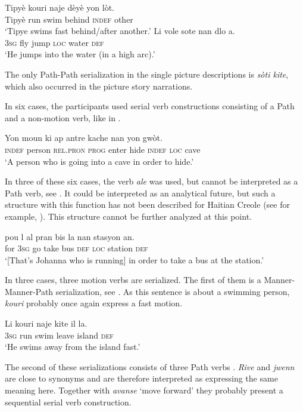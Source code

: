 \documentclass[output=paper,colorlinks,citecolor=brown]{langscibook}
\begin{document}
\ea\label{ex:3:60}
\gll Tipyè kouri naje dèyè yon lòt.\\
     Tipyè run swim behind \textsc{indef} other \\
\glt ‘Tipye swims fast behind/after another.’
\ex\label{ex:3:61}
\gll Li vole sote nan dlo a.\\
     \textsc{3sg} fly jump \textsc{loc} water \textsc{def} \\
\glt ‘He jumps into the water (in a high arc).’
\z

The only Path-Path serialization in the single picture descriptions is \emph{sòti kite}, which also occurred in the picture story narrations.

In six cases, the participants used serial verb constructions consisting of a Path and a non-motion verb, like in .

\ea\label{ex:3:62}
\gll   Yon moun ki ap antre kache nan yon gwòt. \\
      \textsc{indef} person \textsc{rel.pron} \textsc{prog} enter hide \textsc{indef} \textsc{loc} cave \\
\glt ‘A person who is going into a cave in order to hide.’
\z

In three of these six cases, the verb \emph{ale} was used, but cannot be interpreted as a Path verb, see . It could be interpreted as an analytical future, but such a structure with this function has not been described for Haitian Creole (see for example, \cite{Valdman_2015,DeGraff_2007}). This structure cannot be further analyzed at this point.

\ea\label{ex:3:63}
     pou l al pran bis la  nan stasyon an.\\
          {}                        for \textsc{3sg} go take bus \textsc{def} \textsc{loc} station \textsc{def}\\
\glt ‘{[}That’s Johanna who is running{]} in order to take a bus at the station.’
\z

In three cases, three motion verbs are serialized. The first of them is a Manner-Manner-Path serialization, see . As this sentence is about a swimming person, \emph{kouri} probably once again express a fast motion.

\ea\label{ex:3:64}
\gll  Li kouri naje kite il la. \\
      \textsc{3sg} run swim leave island \textsc{def} \\
\glt ‘He swims away from the island fast.’
\z

The second of these serializations consists of three Path verbs . \emph{Rive} and \emph{jwenn} are close to synonyms and are therefore interpreted as expressing the same meaning here. Together with \emph{avanse} ‘move forward’ they probably present a sequential serial verb construction.
\end{document}
